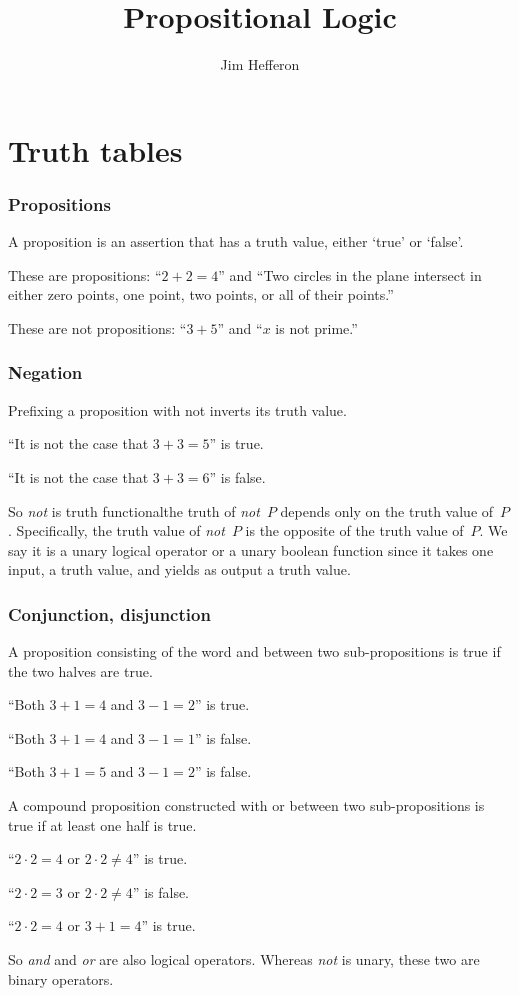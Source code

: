 \documentclass[10pt,t]{beamer}
\title[Propositional Logic] %
{Propositional Logic}
\author{{\small Jim Hef{}feron}}
\institute{
  \texttt{http://joshua.smcvt.edu/proofs}
}
\date{}
\begin{document}
\begin{frame}
  \titlepage
\end{frame}




\section{Truth tables}

\begin{frame}
  \frametitle{Propositions}

A \alert{proposition} is an assertion that has a truth value, 
either `true' or `false'.

\pause
These are propositions: ``$2+2=4$'' 
and ``Two circles in the plane intersect in either zero points, one point,
two points, or all of their points.''

\pause
These are not propositions: ``$3+5$''
and ``$x$ is not prime.''
\end{frame}



\begin{frame}[<+->]
  \frametitle{Negation}

Prefixing a proposition with \alert{not} inverts its truth value.

``It is not the case that $3+3=5$''
is true.

``It is not the case that $3+3=6$''
is false.

\pause
\bigskip
So \textit{not} is \alert{truth functional}\Dash the truth
of \textit{not}~$P$ depends only on the truth value of~$P$.
Specifically, the truth value of \textit{not}~$P$ is 
the opposite of the truth value of~$P$.  
We say it is a \alert{unary logical operator} or 
a \alert{unary boolean function} since it takes one input, a truth value, 
and yields as output a truth value.


\end{frame}


\begin{frame}
  \frametitle{Conjunction, disjunction}

A proposition consisting of the word \alert{and}
between two sub-propositions is true if
the two halves are true.

``Both $3+1=4$ and 
$3-1=2$''
is true.

``Both $3+1=4$ and 
$3-1=1$''
is false.

``Both $3+1=5$ and 
$3-1=2$''
is false.

\pause
\bigskip
A compound proposition constructed with \alert{or}
between two sub-propositions is true if at least one half
is true.

``$2\cdot 2=4$ or 
$2\cdot 2\neq 4$''
is true.

``$2\cdot 2=3$ or 
$2\cdot 2\neq 4$''
is false.

``$2\cdot 2=4$ or 
$3+1=4$''
is true.

\bigskip
\pause
So
\textit{and} and \textit{or}
are also logical operators.
Whereas \textit{not} is unary, 
these two are binary operators.
\end{frame}
\end{document}
